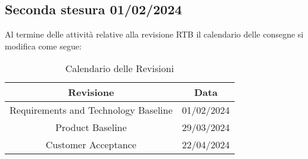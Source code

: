 \subsection{Seconda stesura 01/02/2024}\label{sec:SecondaStesuraCalendario}
Al termine delle attività relative alla revisione RTB il calendario delle consegne si modifica come segue:
\begin{table}[H]
    \centering
    \begin{tabular}{|c|c|}
        \hline
        \textbf{Revisione} & \textbf{Data} \\
        \hline
        Requirements and Technology Baseline & 01/02/2024 \\
        Product Baseline  & 29/03/2024 \\
        Customer Acceptance & 22/04/2024 \\
        \hline
    \end{tabular}
    \caption{Calendario delle Revisioni}
\end{table}